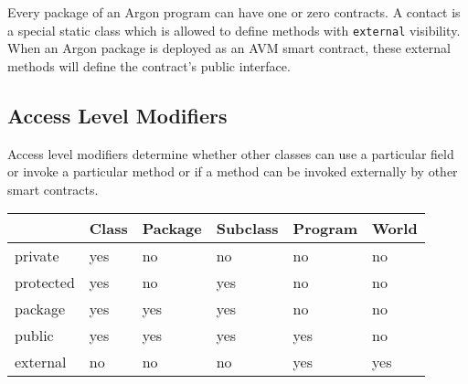 Every package of an Argon program can have one or zero contracts. A contact is a special static class which is
allowed to define methods with \texttt{external} visibility. When an Argon package is deployed as an AVM smart
contract, these external methods will define the contract's public interface.

\subsection{Access Level Modifiers}\label{subsec:access-level-modifiers}

Access level modifiers determine whether other classes can use a particular field or invoke a particular method or
if a method can be invoked externally by other smart contracts.

\begin{center}
    \begin{tabular}{llllll}
        \hline
        & Class & Package & Subclass & Program & World \\
        \hline
        private   & yes   & no      & no       & no      & no    \\
        protected & yes   & no      & yes      & no      & no    \\
        package   & yes   & yes     & yes      & no      & no    \\
        public    & yes   & yes     & yes      & yes     & no    \\
        external  & no    & no      & no       & yes     & yes   \\
        \hline
    \end{tabular}\label{tab:table}
\end{center}



